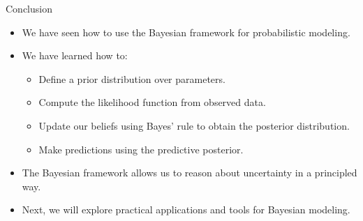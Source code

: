 \documentclass{beamer}
\begin{document}
\begin{frame}{Conclusion}
  \begin{itemize}
    \item We have seen how to use the Bayesian framework for probabilistic modeling.
    \item We have learned how to:
      \begin{itemize}
        \item Define a prior distribution over parameters.
        \item Compute the likelihood function from observed data.
        \item Update our beliefs using Bayes' rule to obtain the posterior distribution.
        \item Make predictions using the predictive posterior.
      \end{itemize}
    \item The Bayesian framework allows us to reason about uncertainty in a principled way.
    \item Next, we will explore practical applications and tools for Bayesian modeling.
    \end{itemize}
\end{frame}
\end{document}
